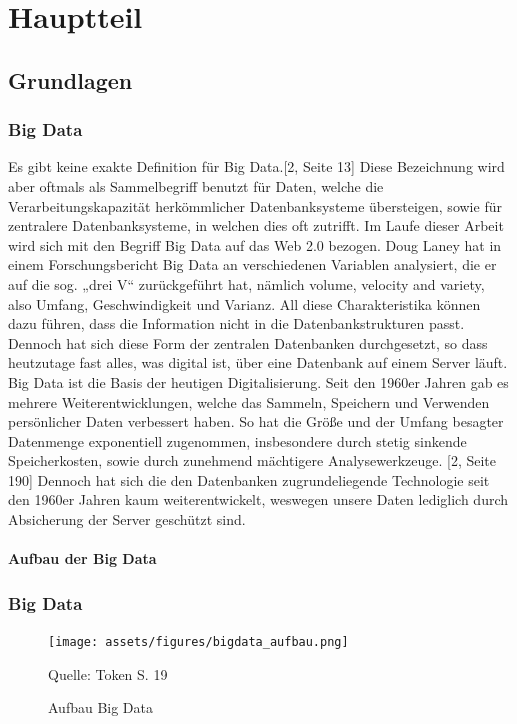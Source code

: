 \newpage
\chapter{Hauptteil}

\section{Grundlagen}

\subsection{Big Data}
Es gibt keine exakte Definition für Big Data.[2, Seite 13] Diese Bezeichnung wird aber oftmals als Sammelbegriff benutzt für Daten, welche die Verarbeitungskapazität herkömmlicher Datenbanksysteme übersteigen, sowie für zentralere Datenbanksysteme, in welchen dies oft zutrifft. Im Laufe dieser Arbeit wird sich mit den Begriff Big Data auf das Web 2.0 bezogen.
Doug Laney hat in einem Forschungsbericht Big Data an verschiedenen Variablen analysiert, die er auf die sog. „drei V“ zurückgeführt hat, nämlich volume, velocity and variety, also Umfang, Geschwindigkeit und Varianz. All diese Charakteristika können dazu führen, dass die Information nicht in die Datenbankstrukturen passt.
Dennoch hat sich diese Form der zentralen Datenbanken durchgesetzt, so dass heutzutage fast alles, was digital ist, über eine Datenbank auf einem Server läuft.
Big Data ist die Basis der heutigen Digitalisierung. Seit den 1960er Jahren gab es mehrere Weiterentwicklungen, welche das Sammeln, Speichern und Verwenden persönlicher Daten verbessert haben. So hat die Größe und der Umfang besagter Datenmenge exponentiell zugenommen, insbesondere durch stetig sinkende Speicherkosten, sowie durch zunehmend mächtigere Analysewerkzeuge. [2, Seite 190]
Dennoch hat sich die den Datenbanken zugrundeliegende Technologie seit den 1960er Jahren kaum weiterentwickelt, weswegen unsere Daten lediglich durch Absicherung der Server geschützt sind.


\subsubsection{Aufbau der Big Data}

\subsection{Big Data}
\begin{figure}[!ht]
    \caption{Aufbau Big Data}
    \texttt{[image: assets/figures/bigdata\_aufbau.png]}
    \begin{flushleft}
        Quelle: Token S. 19
    \end{flushleft}
    \label{fig:birds0}
\end{figure}


